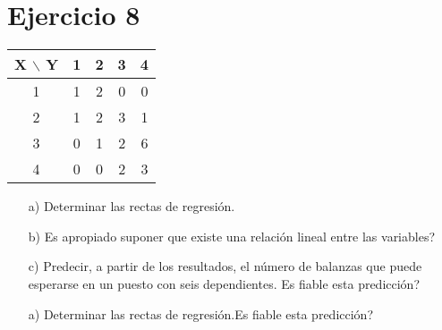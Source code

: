 \documentclass[a4paper,12pt]{article}
\begin{document}
\section*{Ejercicio 8}
\begin{center}
\begin{tabular}{c|cccc}
X $\backslash$ Y & 1 & 2 & 3 & 4 \\
\hline
1 & 1 & 2 & 0 & 0 \\
2 & 1 & 2 & 3 & 1 \\
3 & 0 & 1 & 2 & 6 \\
4 & 0 & 0 & 2 & 3 \\
\end{tabular}
\end{center}

\begin{enumerate}
    \item[a)] Determinar las rectas de regresión.
    \item[b)] \textquestiondown Es apropiado suponer que existe una relación lineal entre las variables?
    \item[c)] Predecir, a partir de los resultados, el número de balanzas que puede esperarse en un puesto con seis dependientes. \textquestiondown Es fiable esta predicción?
\end{enumerate}

\begin{enumerate}
    \item[a)] Determinar las rectas de regresión.\textquestiondown Es fiable esta predicción?
\end{enumerate}

\begin{center}
\end{center}
\end{document}
